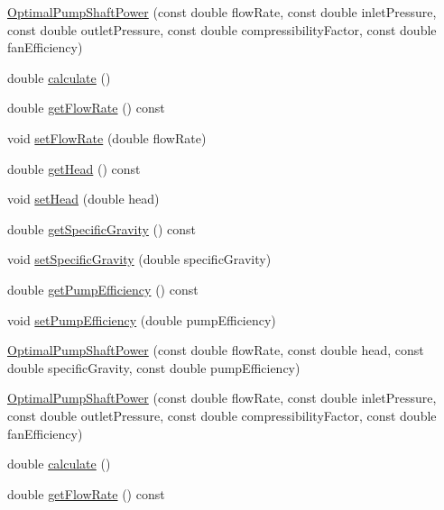 \begin{DoxyCompactItemize}
\item 
\hyperlink{class_optimal_pump_shaft_power_a322ac55881a0170cd4042fcf8a6a9eab}{Optimal\+Pump\+Shaft\+Power} (const double flow\+Rate, const double inlet\+Pressure, const double outlet\+Pressure, const double compressibility\+Factor, const double fan\+Efficiency)
\item 
double \hyperlink{class_optimal_pump_shaft_power_a23ab040eea0a9e0431988bd353076237}{calculate} ()
\item 
double \hyperlink{class_optimal_pump_shaft_power_a8c1532459a196347f7d5219d4690a490}{get\+Flow\+Rate} () const
\item 
void \hyperlink{class_optimal_pump_shaft_power_a38efdee39db4c3856915f1ab26d44ed2}{set\+Flow\+Rate} (double flow\+Rate)
\item 
double \hyperlink{class_optimal_pump_shaft_power_abb285a8a256c10187113c34db1a4462b}{get\+Head} () const
\item 
void \hyperlink{class_optimal_pump_shaft_power_aa080c62ff92fc70a4e27e7710e490b62}{set\+Head} (double head)
\item 
double \hyperlink{class_optimal_pump_shaft_power_a607d32c56edece639e03007adc1bf325}{get\+Specific\+Gravity} () const
\item 
void \hyperlink{class_optimal_pump_shaft_power_aa565a332e4b144c8eb85fd06c541199e}{set\+Specific\+Gravity} (double specific\+Gravity)
\item 
double \hyperlink{class_optimal_pump_shaft_power_a77b9c639438f9d6008c20948f173a2c4}{get\+Pump\+Efficiency} () const
\item 
void \hyperlink{class_optimal_pump_shaft_power_a2cb2c6b537c7db0bc5071f09c66308d0}{set\+Pump\+Efficiency} (double pump\+Efficiency)
\item 
\hyperlink{class_optimal_pump_shaft_power_a40e47716e0c8ecab5deb9eae4c8f9bd0}{Optimal\+Pump\+Shaft\+Power} (const double flow\+Rate, const double head, const double specific\+Gravity, const double pump\+Efficiency)
\item 
\hyperlink{class_optimal_pump_shaft_power_a322ac55881a0170cd4042fcf8a6a9eab}{Optimal\+Pump\+Shaft\+Power} (const double flow\+Rate, const double inlet\+Pressure, const double outlet\+Pressure, const double compressibility\+Factor, const double fan\+Efficiency)
\item 
double \hyperlink{class_optimal_pump_shaft_power_a23ab040eea0a9e0431988bd353076237}{calculate} ()
\item 
double \hyperlink{class_optimal_pump_shaft_power_a8c1532459a196347f7d5219d4690a490}{get\+Flow\+Rate} () const

\end{DoxyCompactItemize}
